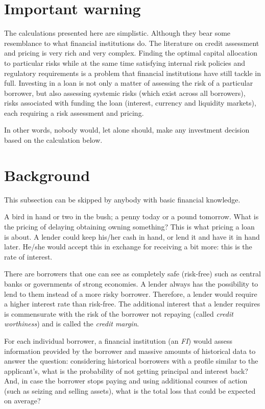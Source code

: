 \documentclass[11pt,]{report}
\begin{document}
\hypertarget{important-warning}{%
\section{Important warning}\label{important-warning}}

The calculations presented here are simplistic. Although they bear some resemblance to what financial institutions do. The literature on credit assessment and pricing is very rich and very complex. Finding the optimal capital allocation to particular risks while at the same time satisfying internal risk policies and regulatory requirements is a problem that financial institutions have still tackle in full. Investing in a loan is not only a matter of assessing the risk of a particular borrower, but also assessing systemic risks (which exist across all borrowers), risks associated with funding the loan (interest, currency and liquidity markets), each requiring a risk assessment and pricing.

In other words, nobody would, let alone should, make any investment decision based on the calculation below.

\hypertarget{background}{%
\section{Background}\label{background}}

This subsection can be skipped by anybody with basic financial knowledge.

A bird in hand or two in the bush; a penny today or a pound tomorrow. What is the pricing of delaying obtaining owning something? This is what pricing a loan is about. A lender could keep his/her cash in hand, or lend it and have it in hand later. He/she would accept this in exchange for receiving a bit more: this is the rate of interest.

There are borrowers that one can see as completely safe (risk-free) such as central banks or governments of strong economies. A lender always has the possibility to lend to them instead of a more risky borrower. Therefore, a lender would require a higher interest rate than risk-free. The additional interest that a lender requires is commensurate with the risk of the borrower not repaying (called \emph{credit worthiness}) and is called the \emph{credit margin}.

For each individual borrower, a financial institution (an \emph{FI}) would assess information provided by the borrower and massive amounts of historical data to answer the question: considering historical borrowers with a profile similar to the applicant's, what is the probability of not getting principal and interest back? And, in case the borrower stops paying and using additional courses of action (such as seizing and selling assets), what is the total loss that could be expected on average?
\end{document}
